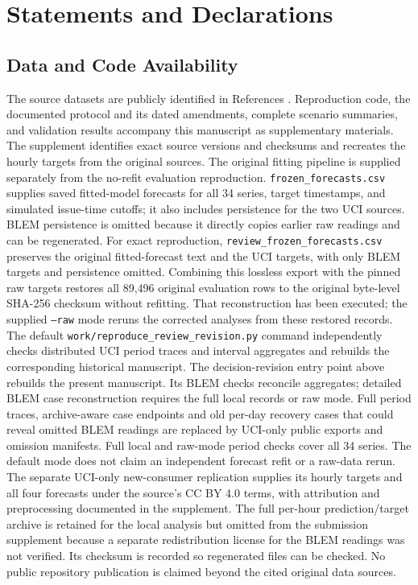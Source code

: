\documentclass[12pt]{article}
\begin{document}
\section*{Statements and Declarations}
\subsection*{Data and Code Availability}
The source datasets are publicly identified in References
\cite{uci,portugal,blem,lcl}. Reproduction code, the documented protocol and its
dated amendments, complete scenario summaries, and
validation results accompany this manuscript as supplementary materials.
The supplement identifies exact source versions and checksums and recreates
the hourly targets from the original sources. The original fitting pipeline
is supplied separately from the no-refit evaluation reproduction.
\texttt{frozen\_forecasts.csv} supplies saved fitted-model forecasts for all
34 series, target timestamps, and simulated issue-time cutoffs; it also
includes persistence for the two UCI sources. BLEM persistence is omitted
because it directly copies earlier raw readings and can be regenerated.
For exact reproduction, \texttt{review\_frozen\_forecasts.csv} preserves
the original fitted-forecast text and the UCI targets, with only BLEM
targets and persistence omitted. Combining this lossless export with the
pinned raw targets restores all 89,496 original evaluation rows to the
original byte-level SHA-256 checksum without refitting. That reconstruction
has been executed; the supplied \texttt{--raw} mode reruns the corrected
analyses from these restored records. The default
\texttt{work/reproduce\_review\_revision.py} command independently checks
distributed UCI period traces and interval aggregates and rebuilds the
corresponding historical manuscript. The decision-revision entry point above rebuilds the present manuscript. Its BLEM checks reconcile aggregates; detailed BLEM case
reconstruction requires the full local records or raw mode. Full period
traces, archive-aware case endpoints and old per-day recovery cases that
could reveal omitted BLEM readings are replaced by UCI-only public exports
and omission manifests. Full local and raw-mode period checks cover all
34 series. The default mode does not claim an independent forecast refit
or a raw-data rerun.
The separate UCI-only new-consumer replication supplies its hourly targets
and all four forecasts under the source's CC BY 4.0 terms, with attribution
and preprocessing documented in the supplement.
The full
per-hour prediction/target archive is retained for the local analysis but
omitted from the submission supplement because a separate redistribution
license for the BLEM readings was not verified. Its checksum is recorded
so regenerated files can be checked. No public
repository publication is claimed beyond the cited original data sources.
\end{document}
